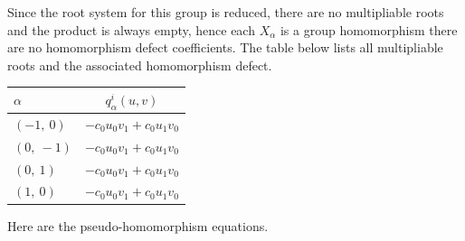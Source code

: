\documentclass[11pt]{article}
\newcommand{\noi}{\noindent}
\theoremstyle{definition}
\newif\ifrootsystemreduced
\begin{document}
\ifrootsystemreduced
Since the root system for this group is reduced, there are no multipliable roots and the product is always empty, hence each $X_\alpha$ is a group homomorphism there are no homomorphism defect coefficients.
\else
The table below lists all multipliable roots and the associated homomorphism defect.

\bigskip

\noindent \begin{tabular}{|l|c|}
    \hline
    $\alpha$ & $q^i_\alpha(u,v)$ \\
    \hline
    $\left( -1, \  0\right)$ & ${- c_{0} u_{0} v_{1} + c_{0} u_{1} v_{0}}$ \\
    \hline
    $\left( 0, \  -1\right)$ & ${- c_{0} u_{0} v_{1} + c_{0} u_{1} v_{0}}$ \\
    \hline
    $\left( 0, \  1\right)$ & ${- c_{0} u_{0} v_{1} + c_{0} u_{1} v_{0}}$ \\
    \hline
    $\left( 1, \  0\right)$ & ${- c_{0} u_{0} v_{1} + c_{0} u_{1} v_{0}}$ \\
    \hline
\end{tabular}


\bigskip

\noi Here are the pseudo-homomorphism equations.
\end{document}
